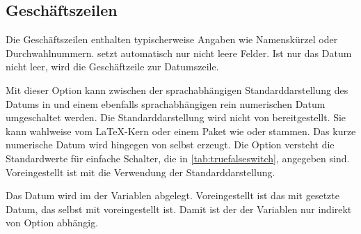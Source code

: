 \subsection{Geschäftszeilen}
%
\BeginIndexGroup
{}%

\iftrue %
Die Geschäftszeilen enthalten typischerweise Angaben wie Namenskürzel oder
Durchwahlnummern. \KOMAScript{} setzt automatisch nur nicht leere Felder. Ist
nur das Datum nicht leer, wird die Geschäftzeile zur Datumszeile.
\else%
Die Geschäftszeile kann auch länger als eine Zeile sein. Sie wird nur gesetzt,
wenn mindestens eine der Variablen für die Geschäftszeile nicht leer ist.  Es
werden nur nicht leere Felder gesetzt. Um\textnote{Tipp!} ein scheinbar leeres
Feld zu setzen, kann man einen scheinbar leeren Variableninhalt wie
\Macro{mbox}\Parameter{} verwenden. Wird auf die Geschäftszeile verzichtet, so
werden an ihrer Stelle Bezeichnung und Inhalt der Variablen
\DescRef{\LabelBase.variable.date} ausgegeben. %
\iffalse%
Informationen, wie Variablen zur Geschäftszeile hinzugefügt oder entfernt
werden, sind in \autoref{sec:scrlttr2-experts.variables},
\DescPageRef{scrlttr2-experts.cmd.removereffields} zu finden.%
\fi%
\fi

\begin{Declaration}
\end{Declaration}
Mit dieser Option kann zwischen der sprachabhängigen Standarddarstellung des
Datums in
 und einem
ebenfalls sprachabhängigen rein numerischen Datum umgeschaltet werden. Die
Standarddarstellung wird nicht von \KOMAScript{} bereitgestellt. Sie kann
wahlweise vom \LaTeX-Kern oder einem Paket wie
 oder
stammen. Das kurze numerische
Datum wird hingegen von  selbst erzeugt. Die Option versteht
die Standardwerte für einfache Schalter, die in \autoref{tab:truefalseswitch},
 angegeben
sind. Voreingestellt ist mit  die
Verwendung der Standarddarstellung.

\begin{Declaration}
\end{Declaration}
Das Datum \iffalse %
in der gewählten Darstellung %
\fi %
wird im  der Variablen 
abgelegt. Voreingestellt ist das mit
 gesetzte Datum, das selbst mit
voreingestellt ist. Damit ist der  der Variablen nur indirekt
von Option %
 abhängig.

